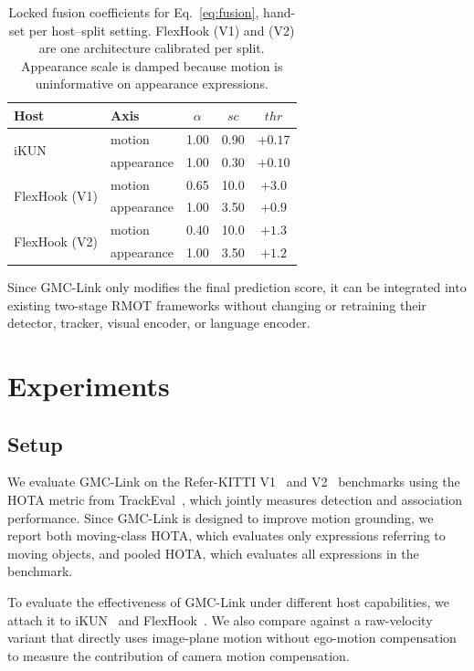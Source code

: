 \documentclass[sigconf,anonymous,nonacm]{acmart}
\begin{document}
\begin{table}[t]
\centering
\caption{Locked fusion coefficients for Eq.~\ref{eq:fusion}, hand-set per host--split setting. FlexHook (V1) and (V2) are one architecture calibrated per split. Appearance scale is damped because motion is uninformative on appearance expressions.}
\label{tab:recipe}
\small
\begin{tabular}{llccc}
\toprule
Host & Axis & $\alpha$ & $\mathit{sc}$ & $\mathit{thr}$ \\
\midrule
\multirow{2}{*}{iKUN}        & motion     & 1.00 & 0.90 & $+0.17$ \\
                             & appearance & 1.00 & 0.30 & $+0.10$ \\
\midrule
\multirow{2}{*}{FlexHook (V1)} & motion     & 0.65 & 10.0 & $+3.0$  \\
                             & appearance & 1.00 & 3.50 & $+0.9$  \\
\midrule
\multirow{2}{*}{FlexHook (V2)} & motion     & 0.40 & 10.0 & $+1.3$  \\
                             & appearance & 1.00 & 3.50 & $+1.2$  \\
\bottomrule
\end{tabular}
\end{table}

Since GMC-Link only modifies the final prediction score, it can be integrated into existing two-stage RMOT frameworks without changing or retraining their detector, tracker, visual encoder, or language encoder.

\section{Experiments}
\label{sec:exp}

\subsection{Setup}
\label{sec:setup}

We evaluate GMC-Link on the Refer-KITTI V1~\cite{transrmot} and V2~\cite{temprmot} benchmarks using the HOTA metric from TrackEval~\cite{hota}, which jointly measures detection and association performance. Since GMC-Link is designed to improve motion grounding, we report both moving-class HOTA, which evaluates only expressions referring to moving objects, and pooled HOTA, which evaluates all expressions in the benchmark.

To evaluate the effectiveness of GMC-Link under different host capabilities, we attach it to iKUN~\cite{ikun} and FlexHook~\cite{flexhook}. We also compare against a raw-velocity variant that directly uses image-plane motion without ego-motion compensation to measure the contribution of camera motion compensation.
\end{document}
